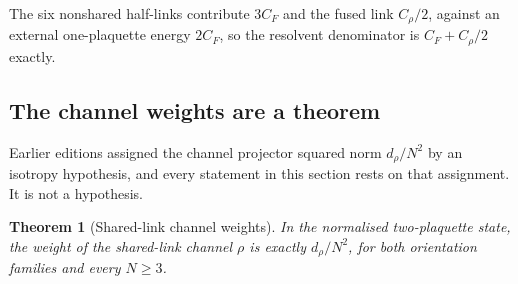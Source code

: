 \documentclass[11pt]{article}
\theoremstyle{plain}
\newtheorem{theorem}{Theorem}
\theoremstyle{definition}
\theoremstyle{remark}
\newcommand{\chk}[1]{}
\newcommand{\CF}{C_F}
\begin{document}
The six nonshared half-links contribute $3\CF$ and the fused link $C_\rho/2$,
against an external one-plaquette energy $2\CF$, so the resolvent denominator
is $\CF+C_\rho/2$ exactly.
\chk{each channel gap is C\_F + C\_R/2, and the weights sum to one}

\subsection{The channel weights are a theorem}

Earlier editions assigned the channel projector squared norm $d_\rho/N^2$ by
an isotropy hypothesis, and every statement in this section rests on that
assignment. It is not a hypothesis.

\begin{theorem}[Shared-link channel weights]\label{thm:weingarten}
In the normalised two-plaquette state, the weight of the shared-link channel
$\rho$ is exactly $d_\rho/N^2$, for both orientation families and every
$N\ge3$.
\end{theorem}
\end{document}
